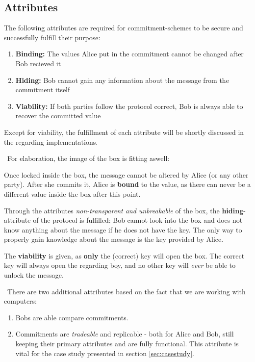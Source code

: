 \subsection{Attributes}
The following attributes are required for commitment-schemes to be secure and successfully fulfill their purpose:

\begin{enumerate}
	\item \textbf{Binding:} The values Alice put in the commitment cannot be changed after Bob recieved it 
	\item \textbf{Hiding:} Bob cannot gain any information about the message from the commitment itself
	\item \textbf{Viability:} If both parties follow the protocol correct, Bob is always able to recover the committed value
\end{enumerate}
Except for viability, the fulfillment of each attribute will be shortly discussed in the regarding implementations. 

~\newline For elaboration, the image of the box is fitting aswell: 

Once locked inside the box, the message cannot be altered by Alice (or any other party). After she commits it, Alice is \textbf{bound} to the value, as there can never be a different value inside the box after this point. 

Through the attributes \textit{non-transparent and unbreakable} of the box, the \textbf{hiding}-attribute of the protocol is fulfilled: Bob cannot look into the box and does not know anything about the message if he does not have the key. The only way to properly gain knowledge about the message is the key provided by Alice. 

The \textbf{viability} is given, as \textbf{only} the (correct) key will open the box. The correct key will always open the regarding boy, and no other key will \textit{ever} be able to unlock the message. 

~\newline There are two additional attributes based on the fact that we are working with computers:
\begin{enumerate}
	\item Bobs are able compare commitments.
	\item Commitments are \textit{tradeable} and replicable - both for Alice and Bob, still keeping their primary attributes and are fully functional. This attribute is vital for the case study presented in section \ref{sec:casestudy}.
\end{enumerate}

